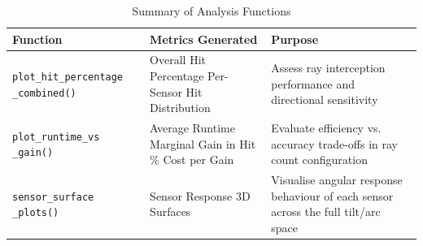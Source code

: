     \begin{table}[h]
        \centering
        \caption{Summary of Analysis Functions}
        \label{tab:analysis_summary}
        \begin{tabular}{>{\raggedright}p{4cm} >{\raggedright}p{5cm} >{\raggedright\arraybackslash}p{5cm}}
            \toprule
            \textbf{Function} & \textbf{Metrics Generated} & \textbf{Purpose} \\
            \midrule
            \texttt{plot\_hit\_percentage \_combined()} & Overall Hit Percentage \newline Per-Sensor Hit Distribution & Assess ray interception performance and directional sensitivity \\
            \texttt{plot\_runtime\_vs \_gain()} & Average Runtime \newline Marginal Gain in Hit \% \newline Cost per Gain & Evaluate efficiency vs. accuracy trade-offs in ray count configuration \\
            \texttt{sensor\_surface \_plots()} & Sensor Response 3D Surfaces & Visualise angular response behaviour of each sensor across the full tilt/arc space \\
            \bottomrule
        \end{tabular}
    \end{table}
